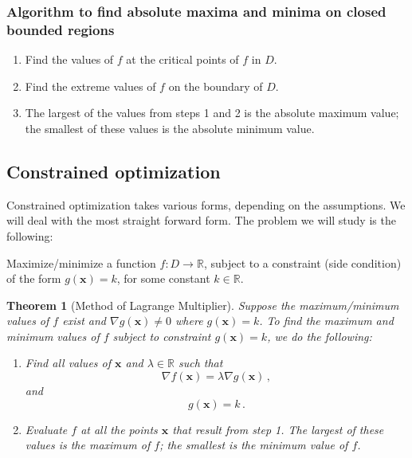 \documentclass[
]{article}
\newtheorem{theorem}{Theorem}[section]
\theoremstyle{definition}
\theoremstyle{definition}
\theoremstyle{definition}
\theoremstyle{definition}
\theoremstyle{remark}
\begin{document}
\hypertarget{algorithm-to-find-absolute-maxima-and-minima-on-closed-bounded-regions}{%
\subsubsection{Algorithm to find absolute maxima and minima on closed bounded regions}\label{algorithm-to-find-absolute-maxima-and-minima-on-closed-bounded-regions}}

\begin{enumerate}
\def\labelenumi{\arabic{enumi}.}
\item
  Find the values of \(f\) at the critical points of \(f\) in \(D\).
\item
  Find the extreme values of \(f\) on the boundary of \(D\).
\item
  The largest of the values from steps 1 and 2 is the absolute maximum value;
  the smallest of these values is the absolute minimum value.
\end{enumerate}

\hypertarget{constrained-optimization}{%
\subsection{Constrained optimization}\label{constrained-optimization}}

Constrained optimization takes various forms, depending on the assumptions.
We will deal with the most straight forward form.
The problem we will study is the following:

Maximize/minimize a function \(f:D\to \mathbb{R}\), subject to a constraint (side condition)
of the form
\(g(\mathbf{x}) = k\), for some constant \(k\in \mathbb{R}\).

\begin{theorem}[Method of Lagrange Multiplier]

Suppose the maximum/minimum values of \(f\) exist and \(\nabla g(\mathbf{x}) \not=0\) where \(g(\mathbf{x}) = k\).
To find the maximum and minimum values of \(f\) subject to constraint
\(g(\mathbf{x}) = k\), we do the following:

\begin{enumerate}
\def\labelenumi{\arabic{enumi}.}
\item
  Find all values of \(\mathbf{x}\) and \(\lambda \in \mathbb{R}\) such that
  \begin{equation*}
   \nabla f(\mathbf{x}) =\lambda \nabla g(\mathbf{x})\,,
  \end{equation*}
  and
  \begin{equation*}
   g(\mathbf{x}) = k \,.
  \end{equation*}
\item
  Evaluate \(f\) at all the points \(\mathbf{x}\) that result from step 1. The largest of
  these values is the maximum of \(f\); the smallest is the minimum value of \(f\).
\end{enumerate}

\end{theorem}
\end{document}

